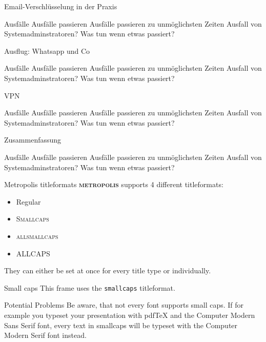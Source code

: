 \documentclass[10pt]{beamer}
\newcommand{\themename}{\textbf{\textsc{metropolis}}\xspace}
\begin{document}
\begin{frame}[fragile]{Email-Verschlüsselung in der Praxis}
\begin{alertblock}{Ausfälle}
	Ausfälle passieren
	Ausfälle passieren zu unmöglichsten Zeiten
	Ausfall von Systemadminstratoren?
	Was tun wenn etwas passiert?
\end{alertblock}
\end{frame}

\begin{frame}[fragile]{Ausflug: Whatsapp und Co}
\begin{alertblock}{Ausfälle}
	Ausfälle passieren
	Ausfälle passieren zu unmöglichsten Zeiten
	Ausfall von Systemadminstratoren?
	Was tun wenn etwas passiert?
\end{alertblock}
\end{frame}

\begin{frame}[fragile]{VPN}
\begin{alertblock}{Ausfälle}
	Ausfälle passieren
	Ausfälle passieren zu unmöglichsten Zeiten
	Ausfall von Systemadminstratoren?
	Was tun wenn etwas passiert?
\end{alertblock}
\end{frame}



\begin{frame}[fragile]{Zusammenfassung}
\begin{alertblock}{Ausfälle}
	Ausfälle passieren
	Ausfälle passieren zu unmöglichsten Zeiten
	Ausfall von Systemadminstratoren?
	Was tun wenn etwas passiert?
\end{alertblock}
\end{frame}



\begin{frame}{Metropolis titleformats}
	\themename supports 4 different titleformats:
	\begin{itemize}
		\item Regular
		\item \textsc{Smallcaps}
		\item \textsc{allsmallcaps}
		\item ALLCAPS
	\end{itemize}
	They can either be set at once for every title type or individually.
\end{frame}

{
\begin{frame}{Small caps}
	This frame uses the \texttt{smallcaps} titleformat.

	\begin{alertblock}{Potential Problems}
		Be aware, that not every font supports small caps. If for example you typeset your presentation with pdfTeX and the Computer Modern Sans Serif font, every text in smallcaps will be typeset with the Computer Modern Serif font instead.
	\end{alertblock}
\end{frame}
}
\end{document}
